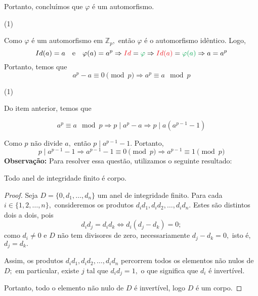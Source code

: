 \documentclass[11pt,a4paper]{article}
\newcommand{\dividiritens}[1]{\begin{tasks}[counter-format={(tsk[a])},label-width=3.6ex, label-format = {\bfseries}, column-sep = {0pt}](1) #1 \end{tasks}}
\newcommand{\pers}[1]{\textcolor{Floresta}{$\negrito{(#1)} $}}
\begin{document}
{\noindent
Portanto, concluímos que $\varphi$ é um automorfismo.

\dividiritens{
\task[\pers{b}]
}
Como $\varphi$ é um automorfismo em $\mathbb{Z}_p,$ então $\varphi$ é o automorfismo idêntico. Logo,
\[
Id(a) = a \quad \mbox{e} \quad \varphi(a) = a^p \Rightarrow \textcolor{Red}{Id} = \textcolor{Green}{\varphi} \Rightarrow  \textcolor{Red}{Id(a)} = \textcolor{Green}{\varphi(a)} \Rightarrow a = a^p
\]
Portanto, temos que
\[
a^p - a \equiv 0 \pmod p \Rightarrow \boxed{a^p \equiv a \mod p}
\]

\dividiritens{
\task[\pers{c}]
}
Do item anterior, temos que 

\[a^p \equiv a \mod p \Rightarrow p \mid a^p - a \Rightarrow p \mid a(a^{p-1} - 1)\]

Como $p$ não divide $a,$ então $p \mid a^{p-1} - 1.$ Portanto,
\[
p \mid a^{p-1} - 1 \Rightarrow a^{p-1} - 1 \equiv 0 \pmod p \Rightarrow \boxed{a^{p-1} \equiv 1 \pmod p}
\]
\textbf{Observação:} Para resolver essa questão, utilizamos o seguinte resultado:
\begin{proposicao}
Todo anel de integridade finito é corpo.
\end{proposicao}
\begin{proof}
Seja $D = \{0, d_1, \ldots, d_n \}$ um anel de integridade finito. Para cada $i \in \{ 1 , 2 , \ldots , n\},$ consideremos os produtos $d_id_1, d_id_2, \ldots , d_id_n.$ Estes são distintos dois a dois, pois 
\[d_id_j = d_id_k \Leftrightarrow d_i(d_j - d_k) = 0;\] como $d_i \neq 0$ e $D$ não tem divisores de zero, necessariamente $d_j - d_k = 0,$ isto é, $d_j = d_k.$

Assim, os produtos $d_id_1, d_id_2, \ldots , d_id_n$ percorrem todos os elementos não nulos de $D;$ em particular, existe $j$ tal que $d_id_j = 1,$ o que significa que $d_i$ é invertível.

Portanto, todo o elemento não nulo de $D$ é invertível, logo $D$ é um corpo.
\end{proof}
}
\end{document}

